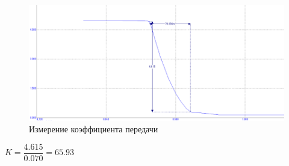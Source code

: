 \documentclass[a4paper,14pt]{article}
\begin{document}
\begin{figure}[H]
	\centering
	\includegraphics[width=0.7\linewidth]{image/KMDP_graf_per}
	\caption{Измерение коэффициента передачи}
	\label{fig:kmdpgrafper}
\end{figure}

$K = \dfrac{4.615}{0.070} = 65.93$

 
\end{document}
